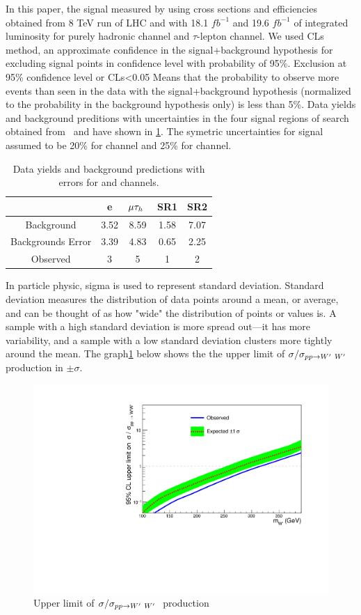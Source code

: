 In this paper, the signal measured by using cross sections and efficiencies obtained from 8 TeV run of LHC and with 18.1 $fb^{-1}$ and 19.6 $fb^{-1}$ of integrated luminosity for purely hadronic channel and $\tau$-lepton channel. We used CLs method, an approximate confidence in the signal+background hypothesis for excluding signal points in confidence level with probability of 95\%. Exclusion at 95\% confidence level or CLs<0.05 Means that the probability to observe more events than seen in the data with the signal+background hypothesis (normalized to the probability in the background hypothesis only) is less than 5\%. Data yields and background preditions with uncertainties in the four signal regions of search obtained from~\cite{Khachatryan:2016trj} and have shown in \ref{tab:yields}. The symetric uncertainties for signal assumed to be 20\% for \lepTau channel and 25\% for \tauTau channel. 

\begin{table}[htb]
	\centering
	\begin{tabular}{|c|c|c|c|c|}
		\hline 
		\wprime  &e\Tau &  $\mu\tau_h~$ & \tauTau SR1 & \tauTau SR2 \\
		\hline 
	         Background &3.52&8.59&1.58&7.07\\     
		 Backgrounds Error& 3.39&4.83&0.65&2.25\\
		 Observed& 3&5&1&2\\
		
		\hline
	\end{tabular}
	\caption{Data yields and background predictions with errors for \lepTau and \tauTau channels. \label{tab:yields} }
\end{table}
 
In particle physic, sigma is used to represent standard deviation. Standard deviation measures the distribution of data points around a mean, or average, and can be thought of as how "wide" the distribution of points or values is. A sample with a high standard deviation is more spread out—it has more variability, and a sample with a low standard deviation clusters more tightly around the mean. The graph\ref{fig:brazil} below shows the the upper limit of $\sigma/\sigma_{pp \rightarrow W^\prime~ W^\prime~}$ production in $\pm\sigma$.

\begin{figure}[!ht]
\centering
\includegraphics*[width=.45\textwidth]{figs/brazilianFlag.pdf}
\caption{Upper limit of $\sigma/\sigma_{pp \rightarrow W^\prime~ W^\prime~}$ production }
\label{fig:brazil}
\end{figure}

